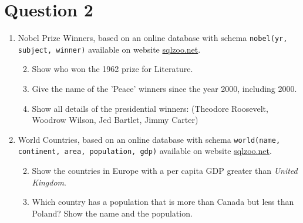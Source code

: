 
\section*{Question 2}

\renewcommand{\labelenumii}{\theenumii}
\renewcommand{\theenumii}{\theenumi.\arabic{enumii}.}

\begin{enumerate}

\item
Nobel Prize Winners, based on an online database with schema \texttt{nobel(yr, subject, winner)} available on website \href{http://sqlzoo.net/wiki/SELECT_from_Nobel_Tutorial}{sqlzoo.net}.

\begin{enumerate}

\setcounter{enumii}{1}
\item
Show who won the 1962 prize for Literature.

\setcounter{enumii}{3}
\item
Give the name of the 'Peace' winners since the year 2000, including 2000.

\setcounter{enumii}{5}
\item
Show all details of the presidential winners: (Theodore Roosevelt, Woodrow Wilson, Jed Bartlet, Jimmy Carter)

\end{enumerate}

\item
World Countries, based on an online database with schema \texttt{world(name, continent, area, population, gdp)} available on website \href{http://sqlzoo.net/wiki/SELECT_within_SELECT_Tutorial}{sqlzoo.net}.

\begin{enumerate}

\setcounter{enumii}{1}
\item
Show the countries in Europe with a per capita GDP greater than \textit{United Kingdom}.

\setcounter{enumii}{3}
\item
Which country has a population that is more than Canada but less than Poland?
Show the name and the population.


\end{enumerate}
\end{enumerate}
